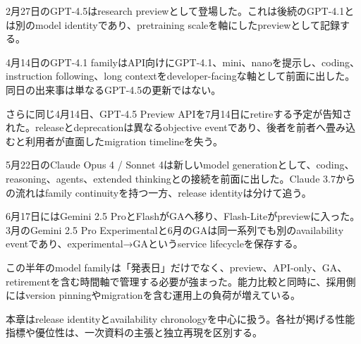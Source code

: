 
2月27日のGPT-4.5はresearch previewとして登場した。これは後続のGPT-4.1とは別のmodel identityであり、pretraining scaleを軸にしたpreviewとして記録する。\autocite{src-3fa7f4cd510b}


4月14日のGPT-4.1 familyはAPI向けにGPT-4.1、mini、nanoを提示し、coding、instruction following、long contextをdeveloper-facingな軸として前面に出した。同日の出来事は単なるGPT-4.5の更新ではない。\autocite{src-31799a46d8d0}


さらに同じ4月14日、GPT-4.5 Preview APIを7月14日にretireする予定が告知された。releaseとdeprecationは異なるobjective eventであり、後者を前者へ畳み込むと利用者が直面したmigration timelineを失う。\autocite{src-31799a46d8d0}


5月22日のClaude Opus 4 / Sonnet 4は新しいmodel generationとして、coding、reasoning、agents、extended thinkingとの接続を前面に出した。Claude 3.7からの流れはfamily continuityを持つ一方、release identityは分けて追う。\autocite{src-4ec03078d316}


6月17日にはGemini 2.5 ProとFlashがGAへ移り、Flash-Liteがpreviewに入った。3月のGemini 2.5 Pro Experimentalと6月のGAは同一系列でも別のavailability eventであり、experimental→GAというservice lifecycleを保存する。\autocite{src-53f15d483a2d}


この半年のmodel familyは「発表日」だけでなく、preview、API-only、GA、retirementを含む時間軸で管理する必要が強まった。能力比較と同時に、採用側にはversion pinningやmigrationを含む運用上の負荷が増えている。\autocite{src-31799a46d8d0,src-53f15d483a2d}


\begin{claimboundary}
本章はrelease identityとavailability chronologyを中心に扱う。各社が掲げる性能指標や優位性は、一次資料の主張と独立再現を区別する。
\end{claimboundary}
